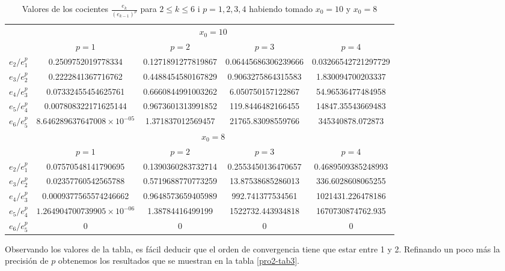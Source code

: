 \documentclass[a4paper]{article}
\begin{document}
\begin{table}[ht]
    \centering
    \begin{tabular}{|c|c|c|c|c|}
        \hline
        & \multicolumn{4}{c|}{$x_0=10$} \\
        \cline{2-5}
        & $p=1$ & $p=2$ & $p=3$ & $p=4$\\
        \hline
        $e_2/e_1^p$ & 0.2509752019778334 & 0.1271891277819867 & 0.06445686306239666 & 0.03266542721297729	\\
        \hline
        $e_3/e_2^p$ & 0.2222841367716762 & 0.4488454580167829 & 0.9063275864315583 & 1.830094700203337\\	
        \hline
        $e_4/e_3^p$ & 0.07332455454625761 & 0.6660844991003262 & 6.050750157122867 & 54.96536477484958\\	
        \hline
        $e_5/e_4^p$ & 0.007808322171625144 & 0.9673601313991852 & 119.8446482166455 & 14847.35543669483\\	
        \hline
        $e_6/e_5^p$ & $8.646289637647008\times10^{-05}$ & 1.371837012569457 & 21765.83098559766 & 345340878.072873\\
        \hline
        \hline
        & \multicolumn{4}{c|}{$x_0=8$} \\
        \cline{2-5}
        & $p=1$ & $p=2$ & $p=3$ & $p=4$\\
        \hline
        $e_2/e_1^p$ & 0.07570548141790695 & 0.1390360283732714 & 0.2553450136470657 & 0.4689509385248993 \\
        \hline
        $e_3/e_2^p$ & 0.02357760542565788 & 0.5719688770773259 & 13.87538685286013 & 336.6028608065255 \\	
        \hline
        $e_4/e_3^p$ & 0.0009377565574246662 & 0.9648573659405989 & 992.741377534561 & 1021431.226478186 \\	
        \hline
        $e_5/e_4^p$ & $1.264904700739905\times10^{-06}$ & 1.38784416499199 & 1522732.443934818 & 1670730874762.935 \\	
        \hline
        $e_6/e_5^p$ & 0 & 0 & 0 & 0\\
        \hline
    \end{tabular}
    \caption{Valores de los cocientes $\frac{e_k}{(e_{k-1})^p}$ para $2\leq k\leq 6$ i $p=1,2,3,4$ habiendo tomado $x_0=10$ y $x_0=8$}
    \label{pro2-tab2}
\end{table}
Observando los valores de la tabla, es fácil deducir que el orden de convergencia tiene que estar entre 1 y 2. Refinando un poco más la precisión de $p$ obtenemos los resultados que se muestran en la tabla \ref{pro2-tab3}.\par
\end{document}
